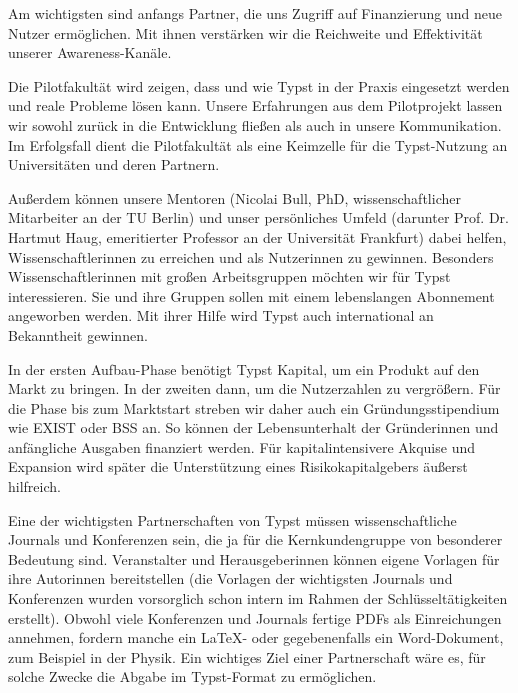 \documentclass[11pt, a4paper]{article}
\newcommand{\gender}{\raisebox{-.25em}{*}}
\begin{document}
Am wichtigsten sind anfangs Partner, die uns Zugriff auf Finanzierung und neue Nutzer ermöglichen. Mit ihnen verstärken wir die Reichweite und Effektivität unserer Awareness-Kanäle.

Die Pilotfakultät wird zeigen, dass und wie Typst in der Praxis eingesetzt werden und reale Probleme lösen kann. Unsere Erfahrungen aus dem Pilotprojekt lassen wir sowohl zurück in die Entwicklung fließen als auch in unsere Kommunikation. Im Erfolgsfall dient die Pilotfakultät als eine Keimzelle für die Typst-Nutzung an Universitäten und deren Partnern.

Außerdem können unsere Mentoren (Nicolai Bull, PhD, wissenschaftlicher Mitarbeiter an der TU Berlin) und unser persönliches Umfeld (darunter Prof. Dr. Hartmut Haug, emeritierter Professor an der Universität Frankfurt) dabei helfen, Wissenschaftler\gender{}innen zu erreichen und als Nutzer\gender{}innen zu gewinnen. Besonders Wissenschaftler\gender{}innen mit großen Arbeitsgruppen möchten wir für Typst interessieren. Sie und ihre Gruppen sollen mit einem lebenslangen Abonnement angeworben werden. Mit ihrer Hilfe wird Typst auch international an Bekanntheit gewinnen.

In der ersten Aufbau-Phase benötigt Typst Kapital, um ein Produkt auf den Markt zu bringen. In der zweiten dann, um die Nutzerzahlen zu vergrößern. Für die Phase bis zum Marktstart streben wir daher auch ein Gründungsstipendium wie EXIST oder BSS an. So können der Lebensunterhalt der Gründer\gender{}innen und anfängliche Ausgaben finanziert werden. Für kapitalintensivere Akquise und Expansion wird später die Unterstützung eines Risikokapitalgebers äußerst hilfreich.

Eine der wichtigsten Partnerschaften von Typst müssen wissenschaftliche Journals und Konferenzen sein, die ja für die Kernkundengruppe von besonderer Bedeutung sind. Veranstalter\gender{} und Herausgeber\gender{}innen können eigene Vorlagen für ihre Autor\gender{}innen bereitstellen (die Vorlagen der wichtigsten Journals und Konferenzen wurden vorsorglich schon intern im Rahmen der Schlüsseltätigkeiten erstellt). Obwohl viele Konferenzen und Journals fertige PDFs als Einreichungen annehmen, fordern manche ein LaTeX- oder gegebenenfalls ein Word-Dokument, zum Beispiel in der Physik. Ein wichtiges Ziel einer Partnerschaft wäre es, für solche Zwecke die Abgabe im Typst-Format zu ermöglichen.
\end{document}
